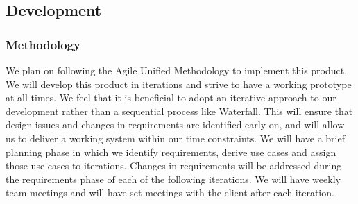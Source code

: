 \documentclass{article}
\begin{document}
    \subsection{Development}
        \subsubsection{Methodology}
        We plan on following the Agile Unified Methodology to implement this product. We will develop this product in iterations and strive to have a working prototype at all times. We feel that it is beneficial to adopt an iterative approach to our development rather than a sequential process like Waterfall. This will ensure that design issues and changes in requirements are identified early on, and will allow us to deliver a working system within our time constraints. We will have a brief planning phase in which we identify requirements, derive use cases and assign those use cases to iterations. Changes in requirements will be addressed during the requirements phase of each of the following iterations. We will have weekly team meetings and will have set meetings with the client after each iteration.
\end{document}
